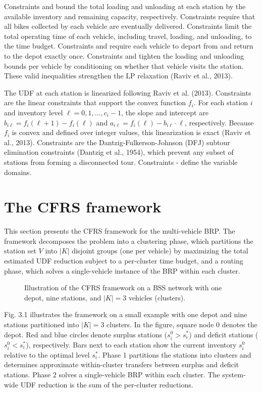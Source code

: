 \documentclass[11pt]{article}
\numberwithin{table}{section}
\numberwithin{figure}{section}
\begin{document}
Constraints  and  bound the total loading and unloading at each station by the available inventory and remaining capacity, respectively. Constraints  require that all bikes collected by each vehicle are eventually delivered. Constraints  limit the total operating time of each vehicle, including travel, loading, and unloading, to the time budget. Constraints  and  require each vehicle to depart from and return to the depot exactly once. Constraints  and  tighten the loading and unloading bounds per vehicle by conditioning on whether that vehicle visits the station. These valid inequalities strengthen the LP relaxation (Raviv et al., 2013).

The UDF at each station is linearized following Raviv et al. (2013). Constraints  are the linear constraints that support the convex function ${{f}_{i}}$. For each station $i$ and inventory level $\ell =0,1,\ldots ,{{c}_{i}}-1$, the slope and intercept are ${{b}_{i\ell }}={{f}_{i}}\left( \ell +1 \right)-{{f}_{i}}\left( \ell  \right)$ and ${{a}_{i\ell }}={{f}_{i}}\left( \ell  \right)-{{b}_{i\ell }}\cdot \ell $, respectively. Because $f_i$ is convex and defined over integer values, this linearization is exact (Raviv et al., 2013). Constraints  are the Dantzig-Fulkerson-Johnson (DFJ) subtour elimination constraints (Dantzig et al., 1954), which prevent any subset of stations from forming a disconnected tour. Constraints - define the variable domains.

\section{The CFRS framework}

This section presents the CFRS framework for the multi-vehicle BRP. The framework decomposes the problem into a clustering phase, which partitions the station set $V$ into $\left|K\right|$ disjoint groups (one per vehicle) by maximizing the total estimated UDF reduction subject to a per-cluster time budget, and a routing phase, which solves a single-vehicle instance of the BRP within each cluster.

\begin{figure}[htbp]
\centering
{}
\caption{Illustration of the CFRS framework on a BSS network with one depot, nine stations, and $\left| K \right|=3$ vehicles (clusters).}
\end{figure}

Fig. 3.1 illustrates the framework on a small example with one depot and nine stations partitioned into $\left| K \right|=3$ clusters. In the figure, square node 0 denotes the depot. Red and blue circles denote surplus stations ($s_{i}^{0}>s_{i}^{*}$) and deficit stations ($s_{i}^{0}<s_{i}^{*}$), respectively. Bars next to each station show the current inventory $s_{i}^{0}$ relative to the optimal level $s_{i}^{*}$. Phase 1 partitions the stations into clusters and determines approximate within-cluster transfers between surplus and deficit stations. Phase 2 solves a single-vehicle BRP within each cluster. The system-wide UDF reduction is the sum of the per-cluster reductions.
\end{document}
